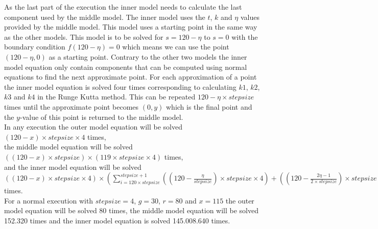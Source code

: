 	As the last part of the execution the inner model needs to calculate the last component used by the middle model. The inner model uses the $t$, $k$ and $\eta$ values provided by the middle model. This model uses a starting point in the same way as the other models. This model is to be solved for $s = 120 - \eta$ to $s=0$ with the boundary condition $f(120 - \eta) = 0$ which means we can use the point $(120-\eta,0)$ as a starting point. Contrary to the other two models the inner model equation only contain components that can be computed using normal equations to find the next approximate point. For each approximation of a point the inner model equation is solved four times corresponding to calculating $k1$, $k2$, $k3$ and $k4$ in the Runge Kutta method. This can be repeated $120 - \eta \times stepsize$ times until the approximate point becomes $(0,y)$ which is the final point and the $y$-value of this point is returned to the middle model. \\ 
	
	In any execution the outer model equation will be solved \\
	$(120-x) \times stepsize \times 4$ times,\\
	the middle model equation will be solved \\
	$((120-x) \times stepsize) \times (119 \times stepsize \times 4)$ times, \\
	and the inner model equation will be solved \\
	 $((120-x) \times stepsize \times 4) \times 
	(\sum\limits_{i=120 \times stepsize}^{stepsize+1} 
	(
	(120 - \frac{\eta}{stepsize}) \times stepsize \times 4) + 
	((120 - \frac{2\eta - 1}{2 \times stepsize})\times stepsize \times 4) +
	((120 - \frac{2\eta - 1}{2 \times stepsize})\times stepsize \times 4) +
	(120 - \frac{\eta-1}{stepsize}) \times stepsize \times 4)
	)$ times.\\
	
	For a normal execution with $stepsize=4$, $g=30$, $r=80$ and $x=115$ the outer model equation will be solved 80 times, the middle model equation will be solved 152.320 times and the inner model equation is solved 145.008.640 times.
